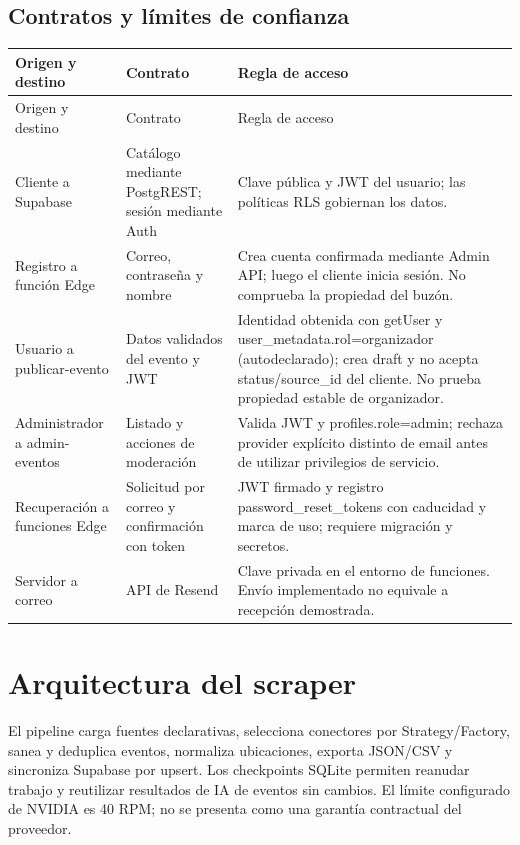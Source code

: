 \subsection{Contratos y límites de confianza}
\begin{longtable}{p{3.1cm}p{4.0cm}p{7.0cm}}
\toprule Origen y destino & Contrato & Regla de acceso \\\midrule\endfirsthead
\toprule Origen y destino & Contrato & Regla de acceso \\\midrule\endhead
Cliente a Supabase & Catálogo mediante PostgREST; sesión mediante Auth & Clave pública y JWT del usuario; las políticas RLS gobiernan los datos. \\
Registro a función Edge & Correo, contraseña y nombre & Crea cuenta confirmada mediante Admin API; luego el cliente inicia sesión. No comprueba la propiedad del buzón. \\
Usuario a publicar-evento & Datos validados del evento y JWT & Identidad obtenida con getUser y user\_metadata.rol=organizador (autodeclarado); crea draft y no acepta status/source\_id del cliente. No prueba propiedad estable de organizador. \\
Administrador a admin-eventos & Listado y acciones de moderación & Valida JWT y profiles.role=admin; rechaza provider explícito distinto de email antes de utilizar privilegios de servicio. \\
Recuperación a funciones Edge & Solicitud por correo y confirmación con token & JWT firmado y registro password\_reset\_tokens con caducidad y marca de uso; requiere migración y secretos. \\
Servidor a correo & API de Resend & Clave privada en el entorno de funciones. Envío implementado no equivale a recepción demostrada. \\
\bottomrule\end{longtable}

\section{Arquitectura del scraper}
\label{sec:scraper}
El pipeline carga fuentes declarativas, selecciona conectores por Strategy/Factory,
sanea y deduplica eventos, normaliza ubicaciones, exporta JSON/CSV y sincroniza
Supabase por upsert. Los checkpoints SQLite permiten reanudar trabajo y reutilizar
resultados de IA de eventos sin cambios. El límite configurado de NVIDIA es 40 RPM;
no se presenta como una garantía contractual del proveedor.

